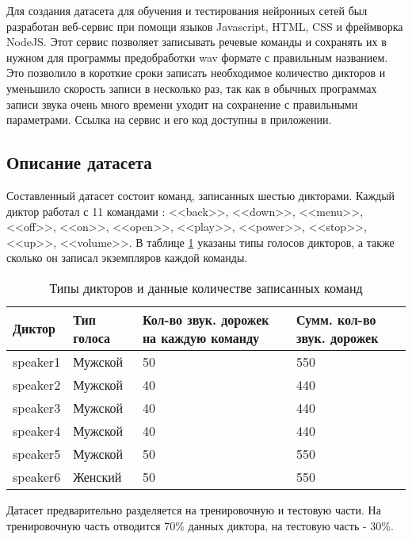 Для создания датасета для обучения и тестирования нейронных сетей был разработан веб-сервис при помощи языков Javascript, HTML, CSS и фреймворка NodeJS. Этот сервис позволяет записывать речевые команды и сохранять их в нужном для программы предобработки wav формате с правильным названием. Это позволило в короткие сроки записать необходимое количество дикторов и уменьшило скорость записи в несколько раз, так как в обычных программах записи звука очень много времени уходит на сохранение с правильными параметрами. Ссылка на сервис и его код доступны в приложении.

\subsection{Описание датасета}
Составленный датасет состоит команд, записанных шестью дикторами. Каждый диктор работал с 11 командами : <<back>>, <<down>>, <<menu>>, <<off>>, <<on>>, <<open>>, <<play>>, <<power>>, <<stop>>, <<up>>, <<volume>>. В таблице \ref{table:dataset} указаны типы голосов дикторов, а также сколько он записал экземпляров каждой команды.


\begin{table}
\begin{tabular}[c]{ | p{1.8cm} | p{2cm} | p{5.8cm} | p{4cm} | }
	\hline
	Диктор & Тип голоса & Кол-во звук. дорожек на каждую команду & Сумм. кол-во звук. дорожек  \\ \hline
	speaker1 & Мужской & 50 & 550 \\
	speaker2 & Мужской & 40 & 440 \\
	speaker3 & Мужской & 40 & 440 \\
	speaker4 & Мужской & 40 & 440 \\
	speaker5 & Мужской & 50 & 550 \\
	speaker6 & Женский & 50 & 550 \\ \hline
	
\end{tabular}
\caption{\label{table:dataset}Типы дикторов и данные количестве записанных команд}
\end{table}

Датасет предварительно разделяется на тренировочную и тестовую части. На тренировочную часть отводится 70\% данных диктора, на тестовую часть - 30\%.
